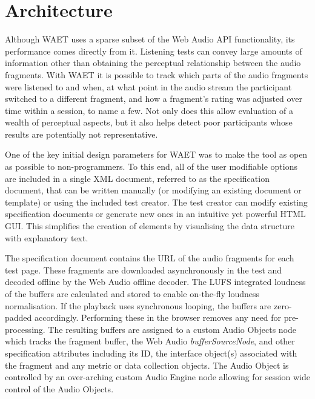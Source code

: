 \documentclass{sig-alternate}
\begin{document}
\section{Architecture}  %
\label{sec:architecture}

    Although WAET uses a sparse subset of the Web Audio API functionality, its performance comes directly from it. Listening tests can convey large amounts of information other than obtaining the perceptual relationship between the audio fragments. With WAET it is possible to track which parts of the audio fragments were listened to and when, at what point in the audio stream the participant switched to a different fragment, and how a fragment's rating was adjusted over time within a session, to name a few. Not only does this allow evaluation of a wealth of perceptual aspects, but it also helps detect poor participants whose results are potentially not representative.
    
    One of the key initial design parameters for WAET was to make the tool as open as possible to non-programmers. To this end, all of the user modifiable options are included in a single XML document, referred to as the specification document, that can be written  manually (or modifying an existing document or template) or using the included test creator. The test creator can modify existing specification documents or generate new ones in an intuitive yet powerful HTML GUI. This simplifies the creation of elements by visualising the data structure with explanatory text.
    
    The specification document contains the URL of the audio fragments for each test page. These fragments are downloaded asynchronously in the test and decoded offline by the Web Audio offline decoder. The LUFS integrated loudness of the buffers are calculated \cite{loudness201510} and stored to enable on-the-fly loudness normalisation. If the playback uses synchronous looping, the buffers are zero-padded accordingly. Performing these in the browser removes any need for pre-processing. The resulting buffers are assigned to a custom Audio Objects node which tracks the fragment buffer, the Web Audio \textit{bufferSourceNode}, and other specification attributes including its ID, the interface object(s) associated with the fragment and any metric or data collection objects. The Audio Object is controlled by an over-arching custom Audio Engine node allowing for session wide control of the Audio Objects.
    
\end{document}
